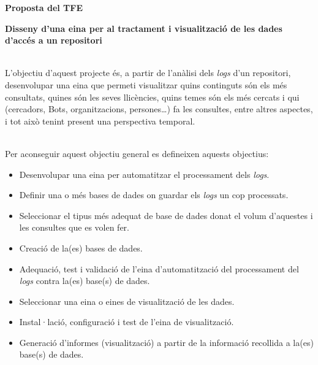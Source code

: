 \documentclass[11pt]{report}
\begin{document}
\begin{center}
    \LARGE
    \textbf{Proposta del TFE}

    \vspace{1cm}
    
    \Large
    \textbf{Disseny d'una eina per al tractament i visualització de les dades d'accés a un repositori} \\
\end{center}

\noindent \\
L'objectiu d'aquest projecte és, a partir de l'anàlisi dels \textit{logs} d'un repositori, desenvolupar una eina que permeti visualitzar quins continguts són els més consultats, quines són les seves llicències, quins temes són els més cercats i qui (cercadors, Bots, organitzacions, persones\dots) fa les consultes, entre altres aspectes, i tot això tenint present una perspectiva temporal.

\noindent \\
Per aconseguir aquest objectiu general es defineixen aquests objectius:

\begin{itemize}
    \item Desenvolupar una eina per automatitzar el processament dels \textit{logs}.
    \item Definir una o més bases de dades on guardar els \textit{logs} un cop processats.
    \item Seleccionar el tipus més adequat de base de dades donat el volum d'aquestes i les consultes que es volen fer.
    \item Creació de la(es) bases de dades.
    \item Adequació, test i validació de l'eina d'automatització del processament del \textit{logs} contra la(es) base(s) de dades.
    \item Seleccionar una eina o eines de visualització de les dades.
    \item Instal·lació, configuració i test de l'eina de visualització.
    \item Generació d'informes (visualització) a partir de la informació recollida a la(es) base(s) de dades.
\end{itemize}
\end{document}
